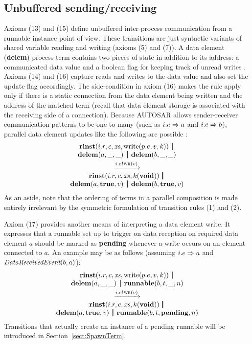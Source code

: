 \documentclass[10pt,conference]{IEEEtran}
\begin{document}
\subsection{Unbuffered sending/receiving}

Axioms (13) and (15) define unbuffered inter-process communication from a runnable instance point of view. These transitions are just syntactic variants of shared variable reading and writing (axioms (5) and (7)). A data element (\textbf{delem}) process term contains two pieces of state in addition to its address: a communicated data value and a boolean flag for keeping track of unread writes \cite[ch.~4.3.1.10.1]{AR:RTE}. Axioms (14) and (16) capture reads and writes to the data value and also set the update flag accordingly. The side-condition in axiom (16) makes the rule apply only if there is a static connection from the data element being written and the address of the matched term (recall that data element storage is associated with the receiving side of a connection). Because AUTOSAR allows sender-receiver communication patterns to be one-to-many (such as $i.e \Rightarrow a$ and $i.e \Rightarrow b$), parallel data element updates like the following are possible \cite[ch.~4.3.1.4]{AR:RTE}:
$$
\begin{array}{c}
  \Trinst {i.r} c \Xs {\TrteWrite {p.e} v k} \,\Opar  \\
  {\Tdelem a \_ \_} \Opar {\Tdelem b \_ \_} \vspace{0.6ex} \\
  \red{\say{i.e}{\Twr v}} \\
  \Trinst {i.r} c \Xs {\Tap k \Tvoid} \,\Opar \\
  {\Tdelem a \Ttrue v} \Opar {\Tdelem b \Ttrue v}
\end{array}
$$
As an aside, note that the ordering of terms in a parallel composition is made entirely irrelevant by the symmetric formulation of transition rules (1) and (2).

Axiom (17) provides another means of interpreting a data element write. It expresses that a runnable set up to trigger on data reception on required data element $a$ should be marked as \textbf{pending} whenever a write occurs on an element connected to $a$. An example may be as follows (assuming $i.e \Rightarrow a$ and $\emph{DataReceivedEvent}(b,a)$):
$$
\begin{array}{c}
  \Trinst {i.r} c \Xs {\TrteWrite {p.e} v k} \,\Opar  \\
  {\Tdelem a \_ \_} \Opar {\Trunnable b t \_ n} \vspace{0.6ex} \\
  \red{\say{i.e}{\Twr v}} \\
  \Trinst {i.r} c \Xs {\Tap k \Tvoid} \,\Opar \\
  {\Tdelem a \Ttrue v} \Opar {\Trunnable b t \Tpending n}
\end{array}
$$
Transitions that actually create an instance of a pending runnable will be introduced in Section~\ref{sect:SpawnTerm}.
\end{document}
